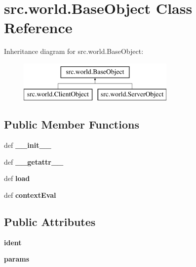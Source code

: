 \hypertarget{classsrc_1_1world_1_1_base_object}{\section{src.\-world.\-Base\-Object \-Class \-Reference}
\label{classsrc_1_1world_1_1_base_object}
}
\-Inheritance diagram for src.\-world.\-Base\-Object\-:\begin{figure}[H]
\begin{center}
\leavevmode
\includegraphics[height=2.000000cm]{classsrc_1_1world_1_1_base_object}
\end{center}
\end{figure}
\subsection*{\-Public \-Member \-Functions}
\begin{DoxyCompactItemize}
\item 
\hypertarget{classsrc_1_1world_1_1_base_object_af9b0564c504dbd3afa84fd94686c23a8}{def {\bfseries \-\_\-\-\_\-init\-\_\-\-\_\-}}\label{classsrc_1_1world_1_1_base_object_af9b0564c504dbd3afa84fd94686c23a8}

\item 
\hypertarget{classsrc_1_1world_1_1_base_object_a9b67f65105eff7e535a8a9e1fa59338c}{def {\bfseries \-\_\-\-\_\-getattr\-\_\-\-\_\-}}\label{classsrc_1_1world_1_1_base_object_a9b67f65105eff7e535a8a9e1fa59338c}

\item 
\hypertarget{classsrc_1_1world_1_1_base_object_a41d299eac2ab4834a7296b7cdebd5c03}{def {\bfseries load}}\label{classsrc_1_1world_1_1_base_object_a41d299eac2ab4834a7296b7cdebd5c03}

\item 
\hypertarget{classsrc_1_1world_1_1_base_object_abb6543d76bbba0b253a9897df843986a}{def {\bfseries context\-Eval}}\label{classsrc_1_1world_1_1_base_object_abb6543d76bbba0b253a9897df843986a}

\end{DoxyCompactItemize}
\subsection*{\-Public \-Attributes}
\begin{DoxyCompactItemize}
\item 
\hypertarget{classsrc_1_1world_1_1_base_object_a61233869acaa51d9beddd921eca8c5ae}{{\bfseries ident}}\label{classsrc_1_1world_1_1_base_object_a61233869acaa51d9beddd921eca8c5ae}

\item 
\hypertarget{classsrc_1_1world_1_1_base_object_a84a88c649a52e017a61ddbdddb733dae}{{\bfseries params}}\label{classsrc_1_1world_1_1_base_object_a84a88c649a52e017a61ddbdddb733dae}

\end{DoxyCompactItemize}
